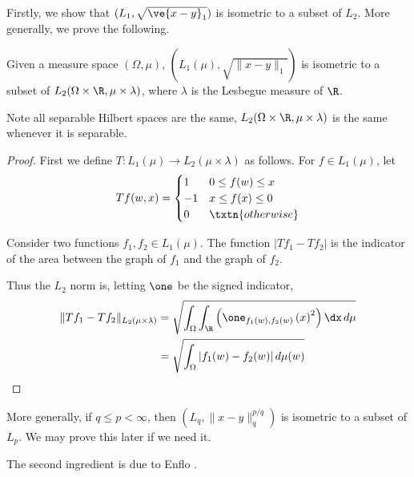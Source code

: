 Firstly, we show that $(L_1,\sqrt{\ve{x-y}_1})$ is isometric to a subset of $L_2$. More generally, we prove the following.
\begin{lem}
Given a measure space $(\Omega, \mu)$, 
$(L_1(\mu), \sqrt{\|x - y\|_1})$ is isometric to a subset of $L_2(\Omega \times \R, \mu \times \lambda)$, where $\lambda$ is the Lesbegue measure of $\R$. 
\end{lem}
Note all separable Hilbert spaces are the same, $L_2(\Omega \times \R, \mu \times \lambda)$ is the same whenever it is separable.
\begin{proof}
First we define $T: L_1(\mu) \to L_2(\mu \times \lambda)$ as follows. For $f \in L_1(\mu)$, let
\[
Tf(w, x) = 
\begin{cases}
1 & 0 \leq f(w) \leq x \\
-1 & x \leq f(x) \leq 0 \\
0 & \txtn{otherwise}
\end{cases}
\]


Consider two functions $f_1, f_2 \in L_1(\mu)$. The function $|Tf_1 - Tf_2|$ is the indicator of the area between the graph of $f_1$ and the graph of $f_2$. 


Thus the $L_2$ norm is, letting  $\one$ be the signed indicator,
\begin{align*}
\|Tf_1 - Tf_2\|_{L_2(\mu \times \lambda)} &= \sqrt{\int_{\Omega}\int_{\R}\left(\one_{f_1(w), f_2(w)}\left(x\right)^2\right)\dx\,d\mu}\\
&=\sqrt{\int_{\Omega} | f_1(w) - f_2(w) | \,d\mu(w)}
\end{align*}
\end{proof}
More generally, if $q \leq p < \infty$, then $(L_q, \|x - y\|_q^{p/q})$ is isometric to a subset of $L_p$. We may prove this later if we need it. 

The second ingredient is due to Enflo .

